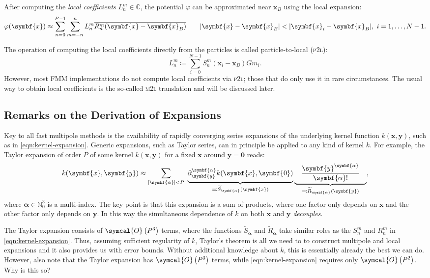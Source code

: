 \documentclass{scrbook}
\newcommand{\naturals}{\ensuremath{\mathbb{N}}}
\newcommand{\complex}{\mathbb{C}}
\newcommand{\vv}[1]{\ensuremath{\symbf{#1}}} %
\newcommand{\bigO}[1]{\ensuremath{\symcal{O}\left({#1}\right)}}
\begin{document}
After computing the \emph{local coefficients} $L_n^m\in\complex$, the potential
$\varphi$ can be approximated near $\vv{x}_B$ using the local expansion:
\begin{equation}
\varphi(\vv{x})\approx\sum_{n=0}^{P-1}\sum_{m=-n\vphantom{0}}^{n}
L_n^m\overline{R_n^m(\vv{x}-\vv{x}_B)}\qquad
|\vv{x}-\vv{x}_B| < |\vv{x}_i-\vv{x}_B|,\ i=1,\dotsc,N-1.
\end{equation}

The operation of computing the local coefficients directly from the particles
is called particle-to-local (\textsc{p2l}):
\begin{equation}\label{eqn:p2l}
L_n^m\coloneqq\sum_{i=0}^{N-1}S_n^m(\vv{x}_i-\vv{x}_B)Gm_i.
\end{equation}
However, most FMM implementations do not compute local coefficients via
\textsc{p2l}; those that do only use it in rare circumstances. The usual way to
obtain local coefficients is the so-called \textsc{m2l} translation and will be
discussed later.

\subsection{Remarks on the Derivation of Expansions}
Key to all fast multipole methods is the availability of rapidly converging
series expansions of the underlying kernel function $k(\vv{x},\vv{y})$, such
as in \cref{eqn:kernel-expansion}. Generic expansions, such as Taylor series,
can in principle be applied to any kind of kernel $k$. For example,
the Taylor expansion of order $P$ of some kernel $k(\vv{x},\vv{y})$ for a fixed
$\vv{x}$ around $\vv{y}=\vv{0}$ reads:
\begin{equation}\label{eqn:taylor-expansion}
k(\vv{x},\vv{y})\approx \sum_{|\vv{\alpha}|<P}\ 
\underbrace{\partial_{\vv{y}}^{\vv{\alpha}}k(\vv{x},\vv{0})
\vphantom{\frac{a}{b}}}_{\eqqcolon%
\widetilde{S}_{\vv{\alpha}}(\vv{x})}
\underbrace{\quad\frac{\vv{y}^{\vv{\alpha}}}{\vv{\alpha}!}\quad}_{\eqqcolon%
\widetilde{R}_{\vv{\alpha}}(\vv{y})},
\end{equation}
where $\vv{\alpha}\in\naturals^3_0$ is a multi-index. The key point is that
this expansion is a sum of products, where one factor only depends on
$\vv{x}$ and the other factor only depends on $\vv{y}$. In this way the
simultaneous dependence of $k$ on both $\vv{x}$ and $\vv{y}$ \emph{decouples}.

The Taylor expansion consists of \bigO{P^3} terms, where the functions
$\widetilde{S}_{\vv{\alpha}}$ and $\widetilde{R}_{\vv{\alpha}}$ take similar
roles as the $S_n^m$ and $R_n^m$ in \cref{eqn:kernel-expansion}. Thus, assuming
sufficient regularity of $k$, Taylor's theorem is all we need to to construct
multipole and local expansions and it also provides us with error bounds.
Without additional knowledge about $k$, this is essentially already the best we
can do. However, also note that the Taylor expansion has \bigO{P^3} terms,
while \cref{eqn:kernel-expansion} requires only \bigO{P^2}. Why is this so?
\end{document}
